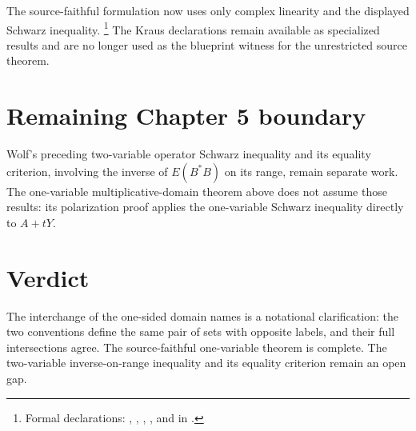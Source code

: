 \documentclass{article}
\begin{document}
The source-faithful formulation now uses only complex linearity and the
displayed Schwarz inequality.
\footnote{Formal declarations:
,
,
,
, and
 in
.}
The Kraus declarations remain available as specialized results and are no
longer used as the blueprint witness for the unrestricted source theorem.

\section{Remaining Chapter 5 boundary}

Wolf's preceding two-variable operator Schwarz inequality and its equality
criterion, involving the inverse of $E(B^*B)$ on its range, remain separate
work.  The one-variable multiplicative-domain theorem above does not assume
those results: its polarization proof applies the one-variable Schwarz
inequality directly to $A+tY$.

\section{Verdict}

The interchange of the one-sided domain names is a notational clarification:
the two conventions define the same pair of sets with opposite labels, and
their full intersections agree.  The source-faithful one-variable theorem is
complete.  The two-variable inverse-on-range inequality and its equality
criterion remain an open gap.



\end{document}

